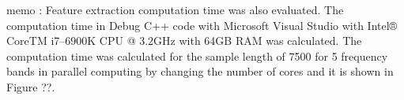 memo :
Feature extraction computation time was also evaluated. The computation time in Debug C++ code with Microsoft Visual Studio with Intel® CoreTM i7–6900K CPU @ 3.2GHz with 64GB RAM was calculated. The computation time was calculated for the sample length of 7500 for 5 frequency bands in parallel computing by changing the number of cores and it is shown in Figure ??. 

